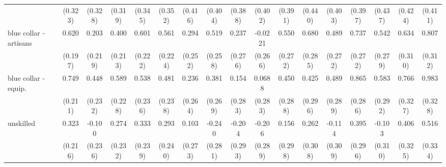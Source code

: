 {\begin{tabular}{l*{16}{c}}
                    &     (0.323)         &     (0.328)         &     (0.319)         &     (0.345)         &     (0.352)         &     (0.416)         &     (0.404)         &     (0.388)         &     (0.402)         &     (0.391)         &     (0.440)         &     (0.403)         &     (0.397)         &     (0.437)         &     (0.424)         &     (0.411)         \\
[1em]
blue collar - artisans&       0.620\sym{**} &       0.203         &       0.400         &       0.601\sym{**} &       0.561\sym{*}  &       0.294         &       0.519\sym{*}  &       0.237         &     -0.0221         &       0.550\sym{*}  &       0.680\sym{*}  &       0.489         &       0.737\sym{**} &       0.542         &       0.634\sym{*}  &       0.807\sym{**} \\
                    &     (0.197)         &     (0.219)         &     (0.213)         &     (0.222)         &     (0.224)         &     (0.252)         &     (0.258)         &     (0.276)         &     (0.266)         &     (0.272)         &     (0.285)         &     (0.272)         &     (0.272)         &     (0.279)         &     (0.310)         &     (0.312)         \\
[1em]
blue collar - equip.&       0.749\sym{***}&       0.448         &       0.589\sym{**} &       0.538\sym{*}  &       0.481\sym{*}  &       0.236         &       0.381         &       0.154         &      0.0688         &       0.450         &       0.425         &       0.489         &       0.865\sym{**} &       0.583\sym{*}  &       0.766\sym{*}  &       0.983\sym{**} \\
                    &     (0.211)         &     (0.232)         &     (0.228)         &     (0.236)         &     (0.238)         &     (0.264)         &     (0.269)         &     (0.283)         &     (0.283)         &     (0.288)         &     (0.296)         &     (0.289)         &     (0.286)         &     (0.292)         &     (0.327)         &     (0.328)         \\
[1em]
unskilled           &       0.323         &      -0.100         &       0.274         &       0.333         &       0.293         &       0.103         &      -0.240         &      -0.204         &      -0.206         &       0.156         &       0.262         &      -0.114         &       0.395         &      -0.103         &       0.406         &       0.516         \\
                    &     (0.216)         &     (0.236)         &     (0.232)         &     (0.239)         &     (0.240)         &     (0.273)         &     (0.281)         &     (0.293)         &     (0.289)         &     (0.298)         &     (0.308)         &     (0.309)         &     (0.296)         &     (0.310)         &     (0.325)         &     (0.334)         \\

\end{tabular}}
